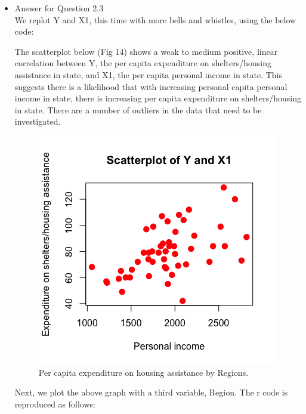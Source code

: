 \documentclass[12pt,letterpaper]{article}
\begin{document}
\begin{itemize}
\item
Answer for Question 2.3\\

\noindent We replot Y and X1, this time with more bells and whistles, using the below code:
\vspace{.5cm}
  
\vspace{.5cm}

\noindent The scatterplot below (Fig 14) shows a weak to medium positive, linear correlation between Y,  the per capita expenditure on shelters/housing assistance in state, and X1, the per capita personal income in state. This suggests there is a likelihood that with increasing personal capita personal income in state, there is increasing per capita expenditure on shelters/housing in state. There are a number of outliers in the data that need to be investigated.\\

\newpage
\begin{figure}[hbtp!]\centering
	\caption{\footnotesize Per capita expenditure on housing assistance by Regions.}
	\label{boxplot}
	\includegraphics[width=.75\textwidth]{Rplot_Colour_Y_X1.png}
\end{figure}

\newpage
\noindent Next, we plot the above graph with a third variable, Region. The r code is reproduced as follows:
\vspace{.5cm}
  
\vspace{.5cm}


\end{itemize}
\end{document}
